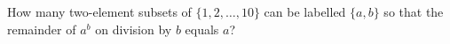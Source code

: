 How many two-element subsets of $\{1,2,\ldots,10\}$ can be labelled $\{a,b\}$ so that the remainder of $a^b$ on division by $b$ equals $a$?
